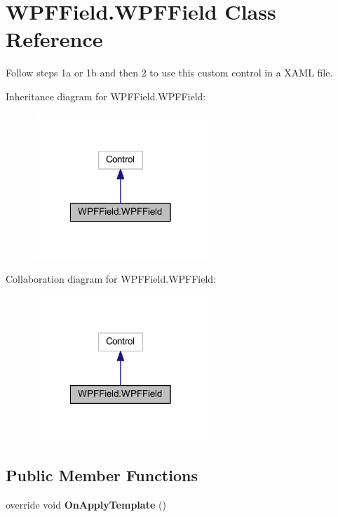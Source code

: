 \hypertarget{class_w_p_f_field_1_1_w_p_f_field}{\section{W\-P\-F\-Field.\-W\-P\-F\-Field Class Reference}
\label{class_w_p_f_field_1_1_w_p_f_field}
}


Follow steps 1a or 1b and then 2 to use this custom control in a X\-A\-M\-L file.  




Inheritance diagram for W\-P\-F\-Field.\-W\-P\-F\-Field\-:\nopagebreak
\begin{figure}[H]
\begin{center}
\leavevmode
\includegraphics[width=186pt]{class_w_p_f_field_1_1_w_p_f_field__inherit__graph}
\end{center}
\end{figure}


Collaboration diagram for W\-P\-F\-Field.\-W\-P\-F\-Field\-:\nopagebreak
\begin{figure}[H]
\begin{center}
\leavevmode
\includegraphics[width=186pt]{class_w_p_f_field_1_1_w_p_f_field__coll__graph}
\end{center}
\end{figure}
\subsection*{Public Member Functions}
\begin{DoxyCompactItemize}
\item 
\hypertarget{class_w_p_f_field_1_1_w_p_f_field_af3eea9f8a4c4e97f6b02f66bbb2f65a5}{override void {\bfseries On\-Apply\-Template} ()}\label{class_w_p_f_field_1_1_w_p_f_field_af3eea9f8a4c4e97f6b02f66bbb2f65a5}

\end{DoxyCompactItemize}


